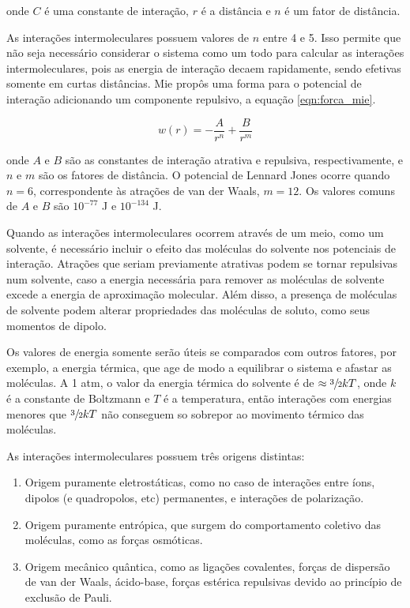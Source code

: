 	\noindent onde \(C\) é uma constante de interação, \(r\) é a distância e \(n\) é um fator de distância.
	
	As interações intermoleculares possuem valores de \(n\) entre 4 e 5. Isso permite que não seja necessário considerar o sistema como um todo para calcular as interações intermoleculares, pois as energia de interação decaem rapidamente, sendo efetivas somente em curtas distâncias. Mie propôs uma forma para o potencial de interação adicionando um componente repulsivo, a equação \ref{eqn:forca_mie}.
	
	\begin{equation}
		w(r) = -\dfrac{A}{r^n} + \dfrac{B}{r^m}
		\label{eqn:forca_mie}
	\end{equation}
	
	\noindent onde \(A\) e \(B\) são as constantes de interação atrativa e repulsiva, respectivamente, e \(n\) e \(m\) são os fatores de distância. O potencial de Lennard Jones ocorre quando \(n = 6\), correspondente às atrações de van der Waals, \(m = 12\). Os valores comuns de \(A\) e \(B\) são \(10^{-77}\) J e \(10^{-134}\) J. %
	
	Quando as interações intermoleculares ocorrem através de um meio, como um solvente, é necessário incluir o efeito das moléculas do solvente nos potenciais de interação. Atrações que seriam previamente atrativas podem se tornar repulsivas num solvente, caso a energia necessária para remover as moléculas de solvente excede a energia de aproximação molecular. Além disso, a presença de moléculas de solvente podem alterar propriedades das moléculas de soluto, como seus momentos de dipolo.
	
	Os valores de energia somente serão úteis se comparados com outros fatores, por exemplo, a energia térmica, que age de modo a equilibrar o sistema e afastar as moléculas. A 1 atm, o valor da energia térmica do solvente é de \(\approx \sfrac{3}{2} kT\), onde \(k\) é a constante de Boltzmann e \(T\) é a temperatura, então interações com energias menores que \(\sfrac{3}{2}kT\) não conseguem so sobrepor ao movimento térmico das moléculas. %
	
	As interações intermoleculares possuem três origens distintas:
	
	\begin{enumerate}[noitemsep]
		\item Origem puramente eletrostáticas, como no caso de interações entre íons, dipolos (e quadropolos, etc) permanentes, e interações de polarização.
		\item Origem puramente entrópica, que surgem do comportamento coletivo das moléculas, como as forças osmóticas.
		\item Origem mecânico quântica, como as ligações covalentes, forças de dispersão de van der Waals, ácido-base, forças estérica repulsivas devido ao princípio de exclusão de Pauli.
	\end{enumerate}
	

